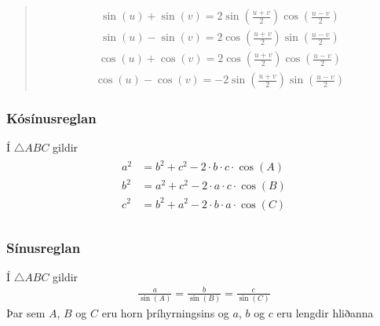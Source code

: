 \documentclass[a4paper,10pt,icelandic]{sphinxmanual}
\begin{document}
\begin{quote}

\begin{equation*}
\begin{split}\sin(u) + \sin(v) = 2\sin\left(\frac{u+v}{2}\right)\cos\left(\frac{u-v}{2}\right)\end{split}
\end{equation*}
\begin{equation*}
\begin{split}\sin(u) - \sin(v) = 2\cos\left(\frac{u+v}{2}\right)\sin\left(\frac{u-v}{2}\right)\end{split}
\end{equation*}
\begin{equation*}
\begin{split}\cos(u) + \cos(v) = 2\cos\left(\frac{u+v}{2}\right)\cos\left(\frac{u-v}{2}\right)\end{split}
\end{equation*}
\begin{equation*}
\begin{split}\cos(u) - \cos(v) = -2\sin\left(\frac{u+v}{2}\right)\sin\left(\frac{u-v}{2}\right)\end{split}
\end{equation*}\end{quote}


\subsubsection{Kósínusreglan}
\label{\detokenize{Kafli12:kosinusreglan}}
Í \(\triangle ABC\) gildir
\begin{equation*}
\begin{split}\begin{aligned}
a^2 &= b^2+c^2-2\cdot b \cdot c \cdot \cos(A) \\
b^2 &= a^2+c^2-2\cdot a \cdot c \cdot \cos(B) \\
c^2 &= b^2+a^2-2\cdot b \cdot a \cdot \cos(C) \\
\end{aligned}\end{split}
\end{equation*}

\subsubsection{Sínusreglan}
\label{\detokenize{Kafli12:sinusreglan}}
Í \(\triangle ABC\) gildir
\begin{equation*}
\begin{split}\frac{a}{\sin(A)} = \frac{b}{\sin(B)} = \frac{c}{\sin(C)}\end{split}
\end{equation*}
Þar sem \(A\), \(B\) og \(C\) eru horn þríhyrningsins og \(a\), \(b\) og \(c\) eru lengdir hliðanna
\end{document}
